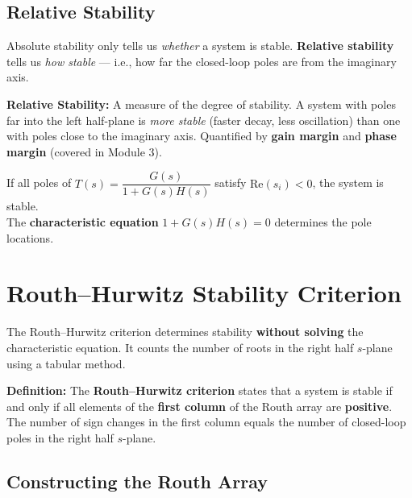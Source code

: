 \documentclass[12pt,a4paper]{article}
\begin{document}
\subsection{Relative Stability}

Absolute stability only tells us \textit{whether} a system is stable. \textbf{Relative stability} tells us \textit{how stable} — i.e., how far the closed-loop poles are from the imaginary axis.

\begin{tcolorbox}[defbox]
\textbf{Relative Stability:} A measure of the degree of stability. A system with poles far into the left half-plane is \textit{more stable} (faster decay, less oscillation) than one with poles close to the imaginary axis. Quantified by \textbf{gain margin} and \textbf{phase margin} (covered in Module 3).
\end{tcolorbox}

\begin{tcolorbox}[formulabox, title={Key Concept}]
If all poles of $T(s) = \dfrac{G(s)}{1+G(s)H(s)}$ satisfy $\text{Re}(s_i) < 0$, the system is stable.\\[4pt]
The \textbf{characteristic equation} $1 + G(s)H(s) = 0$ determines the pole locations.
\end{tcolorbox}

\section{Routh–Hurwitz Stability Criterion}

The Routh–Hurwitz criterion determines stability \textbf{without solving} the characteristic equation. It counts the number of roots in the right half $s$-plane using a tabular method.

\begin{tcolorbox}[defbox]
\textbf{Definition:} The \textbf{Routh–Hurwitz criterion} states that a system is stable if and only if all elements of the \textbf{first column} of the Routh array are \textbf{positive}. The number of sign changes in the first column equals the number of closed-loop poles in the right half $s$-plane.
\end{tcolorbox}

\subsection{Constructing the Routh Array}
\end{document}
